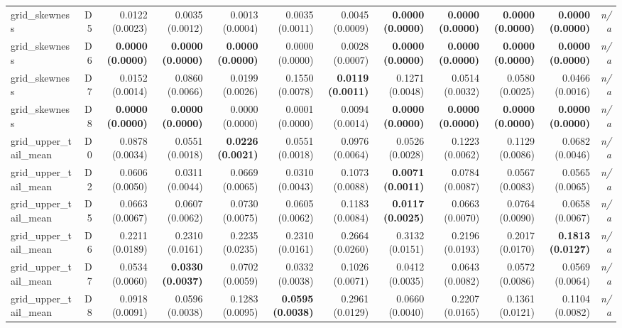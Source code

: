 \begin{table}[htbp]
\begin{tabular}{@{}lrrrrrrrrrrr@{}}
grid\_skewness & D5 & 0.0122 (0.0023) & 0.0035 (0.0012) & 0.0013 (0.0004) & 0.0035 (0.0011) & 0.0045 (0.0009) & \textbf{0.0000 (0.0000)} & \textbf{0.0000 (0.0000)} & \textbf{0.0000 (0.0000)} & \textbf{0.0000 (0.0000)} & \emph{n/a} \\ 
grid\_skewness & D6 & \textbf{0.0000 (0.0000)} & \textbf{0.0000 (0.0000)} & \textbf{0.0000 (0.0000)} & 0.0000 (0.0000) & 0.0028 (0.0007) & \textbf{0.0000 (0.0000)} & \textbf{0.0000 (0.0000)} & \textbf{0.0000 (0.0000)} & \textbf{0.0000 (0.0000)} & \emph{n/a} \\ 
grid\_skewness & D7 & 0.0152 (0.0014) & 0.0860 (0.0066) & 0.0199 (0.0026) & 0.1550 (0.0078) & \textbf{0.0119 (0.0011)} & 0.1271 (0.0048) & 0.0514 (0.0032) & 0.0580 (0.0025) & 0.0466 (0.0016) & \emph{n/a} \\ 
grid\_skewness & D8 & \textbf{0.0000 (0.0000)} & \textbf{0.0000 (0.0000)} & 0.0000 (0.0000) & 0.0001 (0.0000) & 0.0094 (0.0014) & \textbf{0.0000 (0.0000)} & \textbf{0.0000 (0.0000)} & \textbf{0.0000 (0.0000)} & \textbf{0.0000 (0.0000)} & \emph{n/a} \\ 
grid\_upper\_tail\_mean & D0 & 0.0878 (0.0034) & 0.0551 (0.0018) & \textbf{0.0226 (0.0021)} & 0.0551 (0.0018) & 0.0976 (0.0064) & 0.0526 (0.0028) & 0.1223 (0.0062) & 0.1129 (0.0086) & 0.0682 (0.0046) & \emph{n/a} \\ 
grid\_upper\_tail\_mean & D2 & 0.0606 (0.0050) & 0.0311 (0.0044) & 0.0669 (0.0065) & 0.0310 (0.0043) & 0.1073 (0.0088) & \textbf{0.0071 (0.0011)} & 0.0784 (0.0087) & 0.0567 (0.0083) & 0.0565 (0.0065) & \emph{n/a} \\ 
grid\_upper\_tail\_mean & D5 & 0.0663 (0.0067) & 0.0607 (0.0062) & 0.0730 (0.0075) & 0.0605 (0.0062) & 0.1183 (0.0084) & \textbf{0.0117 (0.0025)} & 0.0663 (0.0070) & 0.0764 (0.0090) & 0.0658 (0.0067) & \emph{n/a} \\ 
grid\_upper\_tail\_mean & D6 & 0.2211 (0.0189) & 0.2310 (0.0161) & 0.2235 (0.0235) & 0.2310 (0.0161) & 0.2664 (0.0260) & 0.3132 (0.0151) & 0.2196 (0.0193) & 0.2017 (0.0170) & \textbf{0.1813 (0.0127)} & \emph{n/a} \\ 
grid\_upper\_tail\_mean & D7 & 0.0534 (0.0060) & \textbf{0.0330 (0.0037)} & 0.0702 (0.0059) & 0.0332 (0.0038) & 0.1026 (0.0071) & 0.0412 (0.0035) & 0.0643 (0.0082) & 0.0572 (0.0086) & 0.0569 (0.0064) & \emph{n/a} \\ 
grid\_upper\_tail\_mean & D8 & 0.0918 (0.0091) & 0.0596 (0.0038) & 0.1283 (0.0095) & \textbf{0.0595 (0.0038)} & 0.2961 (0.0129) & 0.0660 (0.0040) & 0.2207 (0.0165) & 0.1361 (0.0121) & 0.1104 (0.0082) & \emph{n/a} \\ 
\bottomrule
\end{tabular}
\end{table}


